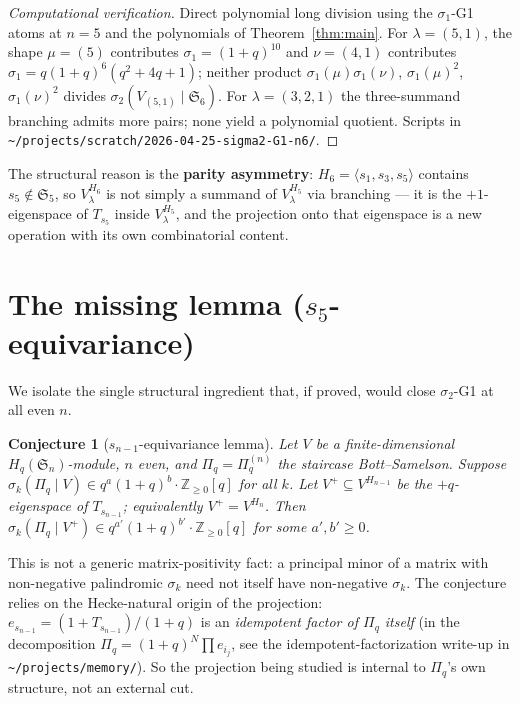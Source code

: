 \documentclass[11pt]{article}
\theoremstyle{plain}
\newtheorem{conjecture}[theorem]{Conjecture}
\theoremstyle{definition}
\theoremstyle{remark}
\newcommand{\Z}{\mathbb{Z}}
\newcommand{\Sym}{\mathfrak{S}}
\newcommand{\Hq}{H_q}
\newcommand{\Pibs}{\Pi_q}
\begin{document}
\begin{proof}[Computational verification]
Direct polynomial long division using the $\sigma_1$-G1 atoms at $n = 5$
\cite{sigma1g1} and the polynomials of Theorem~\ref{thm:main}. For
$\lambda = (5,1)$, the shape $\mu = (5)$ contributes $\sigma_1 = (1+q)^{10}$
and $\nu = (4,1)$ contributes $\sigma_1 = q(1+q)^6(q^2 + 4q + 1)$; neither
product $\sigma_1(\mu)\sigma_1(\nu)$, $\sigma_1(\mu)^2$, $\sigma_1(\nu)^2$
divides $\sigma_2(V_{(5,1)}\mid\Sym_6)$. For $\lambda = (3,2,1)$ the
three-summand branching admits more pairs; none yield a polynomial
quotient. Scripts in \verb|~/projects/scratch/2026-04-25-sigma2-G1-n6/|.
\end{proof}

The structural reason is the \textbf{parity asymmetry}: $H_6 = \langle s_1, s_3, s_5\rangle$
contains $s_5 \notin \Sym_5$, so $V_\lambda^{H_6}$ is not simply a
summand of $V_\lambda^{H_5}$ via branching --- it is the
$+1$-eigenspace of $T_{s_5}$ inside $V_\lambda^{H_5}$, and the
projection onto that eigenspace is a new operation with its own
combinatorial content.

\section{The missing lemma ($s_5$-equivariance)}

We isolate the single structural ingredient that, if proved, would close
$\sigma_2$-G1 at all even $n$.

\begin{conjecture}[$s_{n-1}$-equivariance lemma]\label{conj:sn-lemma}
Let $V$ be a finite-dimensional $\Hq(\Sym_n)$-module, $n$ even,
and $\Pibs = \Pibs^{(n)}$ the staircase Bott--Samelson. Suppose
$\sigma_k(\Pibs \mid V) \in q^a(1+q)^b\cdot \Z_{\geq 0}[q]$ for all $k$.
Let $V^+ \subseteq V^{H_{n-1}}$ be the $+q$-eigenspace of $T_{s_{n-1}}$;
equivalently $V^+ = V^{H_n}$. Then
$\sigma_k(\Pibs \mid V^+) \in q^{a'}(1+q)^{b'}\cdot \Z_{\geq 0}[q]$
for some $a', b' \geq 0$.
\end{conjecture}

This is not a generic matrix-positivity fact: a principal minor of a matrix
with non-negative palindromic $\sigma_k$ need not itself have non-negative
$\sigma_k$. The conjecture relies on the Hecke-natural origin of the
projection: $e_{s_{n-1}} = (1+T_{s_{n-1}})/(1+q)$ is an \emph{idempotent
factor of $\Pibs$ itself} (in the decomposition
$\Pibs = (1+q)^N \prod e_{i_j}$, see the idempotent-factorization
write-up in \verb|~/projects/memory/|). So the projection being studied is
internal to $\Pibs$'s own structure, not an external cut.
\end{document}
